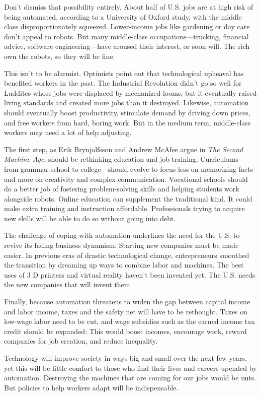 Don't dismiss that possibility entirely. About half of U.S. jobs are
at high risk of being automated, according to a University of Oxford
study, with the middle class disproportionately squeezed. Lower-income
jobs like gardening or day care don't appeal to robots. But many
middle-class occupations---trucking, financial advice, software
engineering---have aroused their interest, or soon will. The rich own
the robots, so they will be fine.

This isn't to be alarmist. Optimists point out that technological
upheaval has benefited workers in the past. The Industrial Revolution
didn't go so well for Luddites whose jobs were displaced by mechanized
looms, but it eventually raised living standards and created more jobs
than it destroyed. Likewise, automation should eventually boost
productivity, stimulate demand by driving down prices, and free workers
from hard, boring work. But in the medium term, middle-class workers
may need a lot of help adjusting.

The first step, as Erik Brynjolfsson and Andrew McAfee argue in
\emph{The Second Machine Age}, should be rethinking education and job
training. Curriculums---from grammar school to college---should evolve
to focus less on memorizing facts and more on creativity and complex
communication. Vocational schools should do a better job of fostering
problem-solving skills and helping students work alongside robots.
Online education can supplement the traditional kind. It could make
extra training and instruction affordable. Professionals trying to
acquire new skills will be able to do so without going into debt.

The challenge of coping with automation underlines the need for the
U.S. to revive its fading business dynamism: Starting new companies must
be made easier. In previous eras of drastic technological change,
entrepreneurs smoothed the transition by dreaming up ways to combine
labor and machines. The best uses of 3 D printers and virtual reality
haven't been invented yet. The U.S. needs the new companies that will
invent them.

Finally, because automation threatens to widen the gap between capital
income and labor income, taxes and the safety net will have to be
rethought. Taxes on low-wage labor need to be cut, and wage subsidies
such as the earned income tax credit should be expanded: This would
boost incomes, encourage work, reward companies for job creation, and
reduce inequality.

Technology will improve society in ways big and small over the next few
years, yet this will be little comfort to those who find their lives and
careers upended by automation. Destroying the machines that are coming
for our jobs would be nuts. But policies to help workers adapt will be
indispensable.

